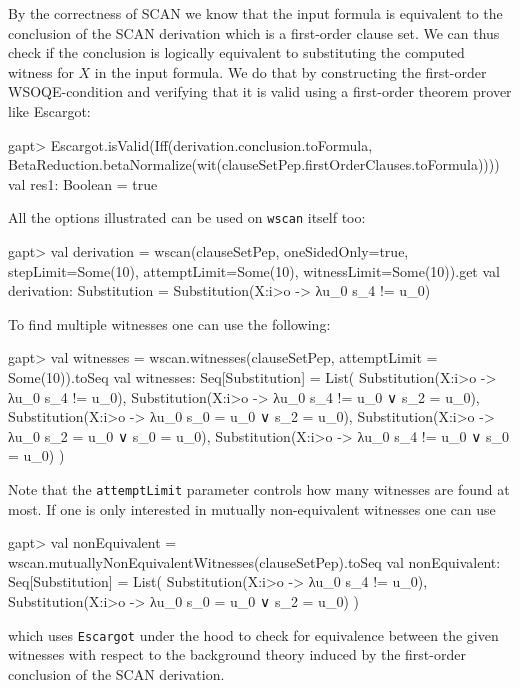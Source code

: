 \documentclass[a4paper,11pt]{book}
\begin{document}
By the correctness of SCAN we know that the input formula is equivalent to the conclusion of the SCAN derivation which is a first-order clause set.
We can thus check if the conclusion is logically equivalent to substituting the computed witness for $X$ in the input formula. We do that by constructing the first-order WSOQE-condition and verifying that it is valid using a first-order theorem prover like Escargot:
\begin{clilisting}
gapt> Escargot.isValid(Iff(derivation.conclusion.toFormula, BetaReduction.betaNormalize(wit(clauseSetPep.firstOrderClauses.toFormula))))
val res1: Boolean = true

\end{clilisting}

All the options illustrated can be used on \texttt{wscan} itself too:
\begin{clilisting}
gapt> val derivation = wscan(clauseSetPep, oneSidedOnly=true, stepLimit=Some(10), attemptLimit=Some(10), witnessLimit=Some(10)).get
val derivation: Substitution = Substitution(X:i>o -> λu_0 s_4 != u_0)

\end{clilisting}

To find multiple witnesses one can use the following:
\begin{clilisting}
gapt> val witnesses = wscan.witnesses(clauseSetPep, attemptLimit = Some(10)).toSeq
val witnesses: Seq[Substitution] = List(
  Substitution(X:i>o -> λu_0 s_4 != u_0),
  Substitution(X:i>o -> λu_0 s_4 != u_0 ∨ s_2 = u_0),
  Substitution(X:i>o -> λu_0 s_0 = u_0 ∨ s_2 = u_0),
  Substitution(X:i>o -> λu_0 s_2 = u_0 ∨ s_0 = u_0),
  Substitution(X:i>o -> λu_0 s_4 != u_0 ∨ s_0 = u_0)
)

\end{clilisting}

Note that the \texttt{attemptLimit} parameter controls how many witnesses are found at most.
If one is only interested in mutually non-equivalent witnesses one can use
\begin{clilisting}
gapt> val nonEquivalent = wscan.mutuallyNonEquivalentWitnesses(clauseSetPep).toSeq
val nonEquivalent: Seq[Substitution] = List(
  Substitution(X:i>o -> λu_0 s_4 != u_0),
  Substitution(X:i>o -> λu_0 s_0 = u_0 ∨ s_2 = u_0)
)

\end{clilisting}
which uses \texttt{Escargot} under the hood to check for equivalence between the given witnesses
with respect to the background theory induced by the first-order conclusion of the SCAN derivation.
\end{document}
